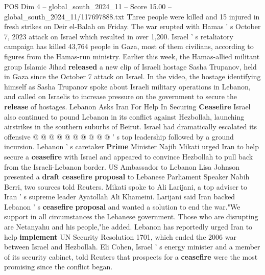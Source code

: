 \begin{textsample}{POS Dim 4 – global\_south\_2024\_11 – Score 15.00 – global\_south\_2024\_11/117697888.txt}
Three people were killed and 15 injured in fresh strikes on Deir el-Balah on Friday.
The war erupted with Hamas ' s October 7, 2023 attack on Israel which resulted in over 1,200.
Israel ' s retaliatory campaign has killed 43,764 people in Gaza, most of them civilians, according to figures from the Hamas-run ministry.
Earlier this week, the Hamas-allied militant group Islamic Jihad \textbf{released} a new clip of Israeli hostage Sasha Trupanov, held in Gaza since the October 7 attack on Israel.
In the video, the hostage identifying himself as Sasha Trupanov spoke about Israeli military operations in Lebanon, and called on Israelis to increase pressure on the government to secure the \textbf{release} of hostages.
Lebanon Asks Iran For Help In Securing \textbf{Ceasefire} Israel also continued to pound Lebanon in its conflict against Hezbollah, launching airstrikes in the southern suburbs of Beirut.
Israel had dramatically escalated its offensive @ @ @ @ @ @ @ @ @ @ ' s top leadership followed by a ground incursion.
Lebanon ' s caretaker \textbf{Prime} Minister Najib Mikati urged Iran to help secure a \textbf{ceasefire} with Israel and appeared to convince Hezbollah to pull back from the Israeli-Lebanon border.
US Ambassador to Lebanon Lisa Johnson presented a \textbf{draft} \textbf{ceasefire} \textbf{proposal} to Lebanese Parliament Speaker Nabih Berri, two sources told Reuters.
Mikati spoke to Ali Larijani, a top adviser to Iran ' s supreme leader Ayatollah Ali Khameini.
Larijani said Iran backed Lebanon ' s \textbf{ceasefire} \textbf{proposal} and wanted a solution to end the war."We support in all circumstances the Lebanese government.
Those who are disrupting are Netanyahu and his people,"he added.
Lebanon has reportedly urged Iran to help \textbf{implement} UN Security Resolution 1701, which ended the 2006 war between Israel and Hezbollah.
Eli Cohen, Israel ' s energy minister and a member of its security cabinet, told Reuters that prospects for a \textbf{ceasefire} were the most promising since the conflict began.

\end{textsample}
